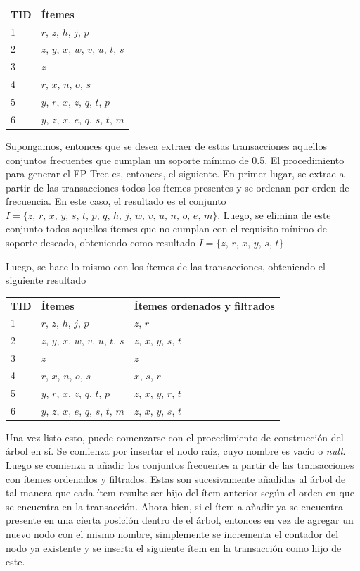 \begin{tabular}{l l}
\textbf{TID} & \textbf{Ítemes} \\
1 & $r$, $z$, $h$, $j$, $p$ \\
2 & $z$, $y$, $x$, $w$, $v$, $u$, $t$, $s$ \\
3 & $z$ \\
4 & $r$, $x$, $n$, $o$, $s$ \\
5 & $y$, $r$, $x$, $z$, $q$, $t$, $p$ \\
6 & $y$, $z$, $x$, $e$, $q$, $s$, $t$, $m$ \\
\end{tabular}

Supongamos, entonces que se desea extraer de estas transacciones aquellos conjuntos frecuentes que cumplan un soporte mínimo de 0.5. El procedimiento para generar el FP-Tree es, entonces, el siguiente. En primer lugar, se extrae a partir de las transacciones todos los ítemes presentes y se ordenan por orden de frecuencia. En este caso, el resultado es el conjunto $I = \{z, \, r, \, x, \, y, \, s, \, t, \, p, \, q, \, h, \, j, \, w, \, v, \, u, \, n, \, o, \, e, \, m\}$. Luego, se elimina de este conjunto todos aquellos ítemes que no cumplan con el requisito mínimo de soporte deseado, obteniendo como resultado $I = \{z, \, r, \, x, \, y, \, s, \, t\}$

Luego, se hace lo mismo con los ítemes de las transacciones, obteniendo el siguiente resultado

\begin{tabular}{l l l}
\textbf{TID} & \textbf{Ítemes} & \textbf{Ítemes ordenados y filtrados} \\
1 & $r$, $z$, $h$, $j$, $p$ & $z$, $r$ \\
2 & $z$, $y$, $x$, $w$, $v$, $u$, $t$, $s$ & $z$, $x$, $y$, $s$, $t$ \\
3 & $z$ & $z$ \\
4 & $r$, $x$, $n$, $o$, $s$ & $x$, $s$, $r$ \\
5 & $y$, $r$, $x$, $z$, $q$, $t$, $p$ & $z$, $x$, $y$, $r$, $t$ \\
6 & $y$, $z$, $x$, $e$, $q$, $s$, $t$, $m$ & $z$, $x$, $y$, $s$, $t$ \\
\end{tabular}

Una vez listo esto, puede comenzarse con el procedimiento de construcción del árbol en sí. Se comienza por insertar el nodo raíz, cuyo nombre es vacío o \textit{null}. Luego se comienza a añadir los conjuntos frecuentes a partir de las transacciones con ítemes ordenados y filtrados. Estas son sucesivamente añadidas al árbol de tal manera que cada ítem resulte ser hijo del ítem anterior según el orden en que se encuentra en la transacción. Ahora bien, si el ítem a añadir ya se encuentra presente en una cierta posición dentro de el árbol, entonces en vez de agregar un nuevo nodo con el mismo nombre, simplemente se incrementa el contador del nodo ya existente y se inserta el siguiente ítem en la transacción como hijo de este.

